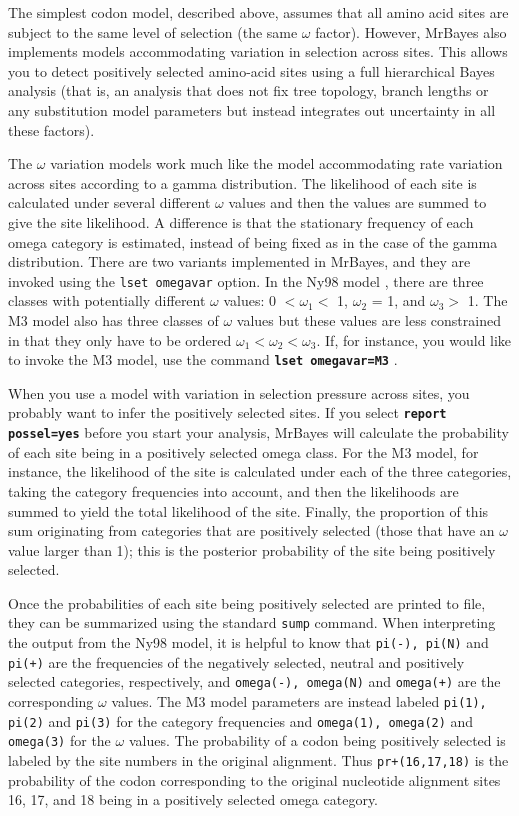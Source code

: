 \documentclass[12pt]{book}
\newcommand{\ttt}[1]{\texttt{#1} }
\newcommand{\tb}[1]{\ttt{\textbf{#1}} }
\begin{document}
The simplest codon model, described above, assumes that all amino acid sites are subject to the
same level of selection (the same $\omega$ factor). However, MrBayes also implements models
accommodating variation in selection across sites. This allows you to detect positively selected
amino-acid sites using a full hierarchical Bayes analysis (that is, an analysis that does not fix
tree topology, branch lengths or any substitution model parameters but instead integrates out
uncertainty in all these factors).

The $\omega$ variation models work much like the model accommodating rate variation across sites
according to a gamma distribution. The likelihood of each site is calculated under several
different $\omega$ values and then the values are summed to give the site likelihood. A difference
is that the stationary frequency of each omega category is estimated, instead of being fixed as in
the case of the gamma distribution. There are two variants implemented in MrBayes, and they are
invoked using the \ttt{lset omegavar} option. In the Ny98 model \citep{nielsen98}, there are three
classes with potentially different $\omega$ values: 0 $< \omega_1 <$ 1, $\omega_2$ = 1, and
$\omega_3 >$ 1. The M3 model also has three classes of $\omega$ values but these values are less
constrained in that they only have to be ordered $\omega_1 < \omega_2 < \omega_3$.  If, for
instance, you would like to invoke the M3 model, use the command \tb{lset omegavar=M3}.

When you use a model with variation in selection pressure across sites, you probably want to infer
the positively selected sites. If you select \tb{report possel=yes} before you start your analysis,
MrBayes will calculate the probability of each site being in a positively selected omega class. For
the M3 model, for instance, the likelihood of the site is calculated under each of the three
categories, taking the category frequencies into account, and then the likelihoods are summed to
yield the total likelihood of the site.  Finally, the proportion of this sum originating from
categories that are positively selected (those that have an $\omega$ value larger than 1); this is
the posterior probability of the site being positively selected.

Once the probabilities of each site being positively selected are printed to file, they can be
summarized using the standard \ttt{sump} command. When interpreting the output from the Ny98 model,
it is helpful to know that \ttt{pi(-), pi(N)} and \ttt{pi(+)} are the frequencies of the negatively
selected, neutral and positively selected categories, respectively, and \ttt{omega(-), omega(N)}
and \ttt{omega(+)} are the corresponding $\omega$ values. The M3 model parameters are instead
labeled \ttt{pi(1), pi(2)} and \ttt{pi(3)} for the category frequencies and \ttt{omega(1),
omega(2)} and \ttt{omega(3)} for the $\omega$ values. The probability of a codon being positively
selected is labeled by the site numbers in the original alignment.  Thus \ttt{pr+(16,17,18)} is the
probability of the codon corresponding to the original nucleotide alignment sites 16, 17, and 18
being in a positively selected omega category.
\end{document}
